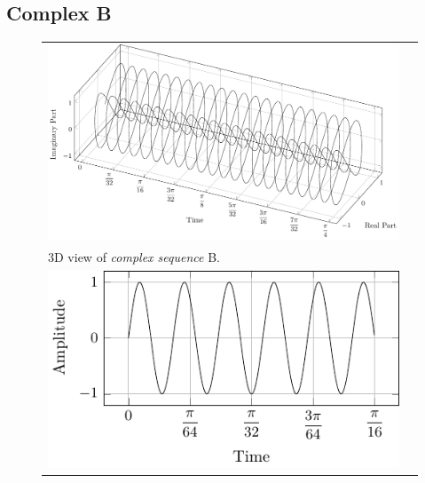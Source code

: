 \documentclass[../../course]{subfiles}
\begin{document}
\subsection{Complex B}

\begin{figure} [H]

    \renewcommand{\arraystretch}{0.75}
    \centering
    \begin{NiceTabularX} {\textwidth} {
            *{2}{>{\centering\arraybackslash}X}
        }

         {
             {
                \includegraphics[height = \textheight] {tikzpics/plotComplexB.pdf}
            }
        }

        &
        \\

         {
            \vbox{
                 {3D view of \emph{complex sequence} B.}
                \label{plt:cmplxB}
            }
        }

        &
        \\

         {
             {
                \includegraphics[height = \textheight] {tikzpics/plotShortX1.pdf}
            }
        }


\end{NiceTabularX}
\end{figure}
\end{document}
